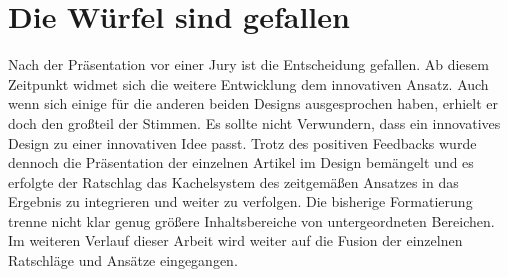 \section{Die Würfel sind gefallen}
Nach der Präsentation vor einer Jury ist die Entscheidung gefallen. Ab diesem Zeitpunkt widmet sich die weitere Entwicklung dem innovativen Ansatz. Auch wenn sich einige für die anderen beiden Designs ausgesprochen haben, erhielt er doch den großteil der Stimmen. Es sollte nicht Verwundern, dass ein innovatives Design zu einer innovativen Idee passt.
Trotz des positiven Feedbacks wurde dennoch die Präsentation der einzelnen Artikel im Design bemängelt und es erfolgte der Ratschlag das Kachelsystem des zeitgemäßen Ansatzes in das Ergebnis zu integrieren und weiter zu verfolgen. Die bisherige Formatierung trenne nicht klar genug größere Inhaltsbereiche von untergeordneten Bereichen.
Im weiteren Verlauf dieser Arbeit wird weiter auf die Fusion der einzelnen Ratschläge und Ansätze eingegangen.
